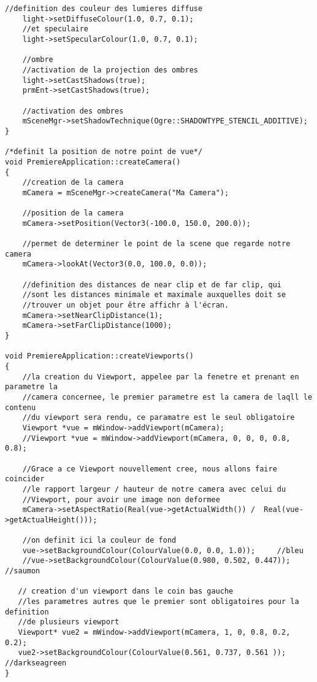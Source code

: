 \begin{lstlisting}[caption={PremiereApplication.cpp}]
    //definition des couleur des lumieres diffuse
    light->setDiffuseColour(1.0, 0.7, 0.1);
    //et speculaire
    light->setSpecularColour(1.0, 0.7, 0.1);

    //ombre
    //activation de la projection des ombres
    light->setCastShadows(true);
    prmEnt->setCastShadows(true);

    //activation des ombres
    mSceneMgr->setShadowTechnique(Ogre::SHADOWTYPE_STENCIL_ADDITIVE);
}

/*definit la position de notre point de vue*/
void PremiereApplication::createCamera()
{
    //creation de la camera
    mCamera = mSceneMgr->createCamera("Ma Camera");

    //position de la camera
    mCamera->setPosition(Vector3(-100.0, 150.0, 200.0));

    //permet de determiner le point de la scene que regarde notre camera
    mCamera->lookAt(Vector3(0.0, 100.0, 0.0));

    //definition des distances de near clip et de far clip, qui
    //sont les distances minimale et maximale auxquelles doit se
    //trouver un objet pour être affichr à l'écran.
    mCamera->setNearClipDistance(1);
    mCamera->setFarClipDistance(1000);
}

void PremiereApplication::createViewports()
{
    //la creation du Viewport, appelee par la fenetre et prenant en parametre la
    //camera concernee, le premier parametre est la camera de laqll le contenu
    //du viewport sera rendu, ce paramatre est le seul obligatoire
    Viewport *vue = mWindow->addViewport(mCamera);
    //Viewport *vue = mWindow->addViewport(mCamera, 0, 0, 0, 0.8, 0.8);

    //Grace a ce Viewport nouvellement cree, nous allons faire coincider
    //le rapport largeur / hauteur de notre camera avec celui du
    //Viewport, pour avoir une image non deformee
    mCamera->setAspectRatio(Real(vue->getActualWidth()) /  Real(vue->getActualHeight()));

    //on definit ici la couleur de fond
    vue->setBackgroundColour(ColourValue(0.0, 0.0, 1.0));     //bleu
    //vue->setBackgroundColour(ColourValue(0.980, 0.502, 0.447)); //saumon

   // creation d'un viewport dans le coin bas gauche
   //les parametres autres que le premier sont obligatoires pour la definition
   //de plusieurs viewport
   Viewport* vue2 = mWindow->addViewport(mCamera, 1, 0, 0.8, 0.2, 0.2);
   vue2->setBackgroundColour(ColourValue(0.561, 0.737, 0.561 ));  //darkseagreen
}


\end{lstlisting}






